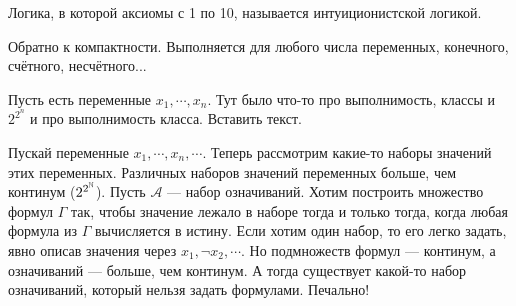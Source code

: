 Логика, в которой аксиомы с 1 по 10, называется интуиционистской логикой.

Обратно к компактности. Выполняется для любого числа переменных, конечного, счётного, несчётного...

Пусть есть переменные $x_1, \cdots, x_n$. Тут было что-то про выполнимость, классы и $2^{2^n}$ и про выполнимость класса. Вставить текст.

Пускай переменные $x_1, \cdots, x_n, \cdots$. Теперь рассмотрим какие-то наборы значений этих переменных.  Различных наборов значений переменных больше, чем континум ($2^{2^{\mathbb{N}}}$). Пусть $\mathcal{A}$ --- набор означиваний. Хотим построить множество формул $\Gamma$ так, чтобы значение лежало в наборе тогда и только тогда, когда любая формула из $\Gamma$ вычисляется в истину. Если хотим один набор, то его легко задать, явно описав значения через $x_1, \lnot x_2, \cdots$. Но подмножеств формул --- континум, а означиваний --- больше, чем континум. А тогда существует какой-то набор означиваний, который нельзя задать формулами. Печально!



